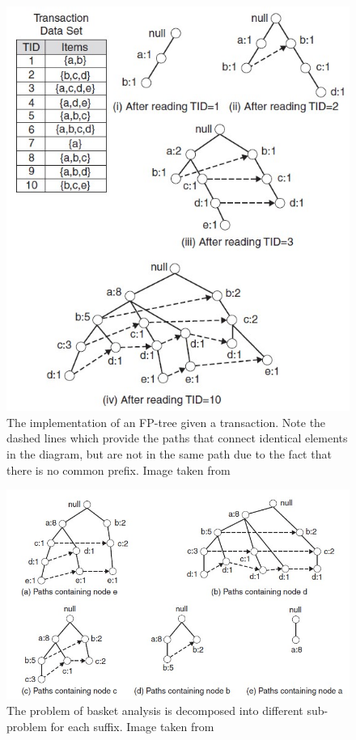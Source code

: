 \documentclass[12pt,%
               a4paper,%
               oneside,openany,%
               titlepage,%
               headinclude,footinclude,%
               BCOR5mm,%
               cleardoublepage=empty,%
               tablecaptionabove,%
               floatperchapter,
               ]{scrreprt}                 %
\begin{document}
\begin{figure}
\begin{center}
\includegraphics[width=\textwidth]{Figures/FP_tree.jpg}
\caption{The implementation of an FP-tree given a transaction. Note the dashed lines which provide the paths that connect identical elements in the diagram, but are not in the same path due to the fact that there is no common prefix.  Image taken from \cite{tan2019introduction} }
\label{FP_tree}
\end{center}
\end{figure}

\begin{figure}
\begin{center}
\includegraphics[width=\textwidth]{Figures/FP_gen_1.jpg}
\caption{The problem of basket analysis is decomposed into different sub-problem for each suffix. Image taken from \cite{tan2019introduction} }
\label{FP_gen_1}
\end{center}
\end{figure}
\end{document}
